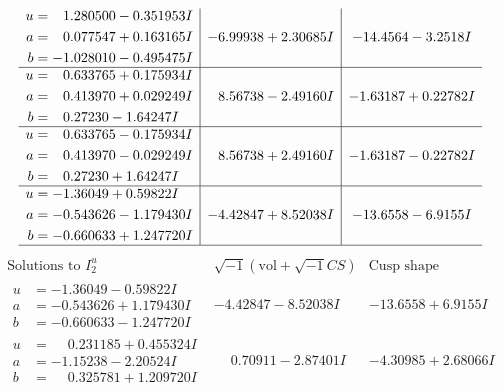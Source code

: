 \documentclass[1p]{elsarticle_modified}
\theoremstyle{definition}
\newcommand{\I}{\sqrt{-1}}
\begin{document}
$$\begin{array}{c|c|c}
\begin{aligned}
u &= \phantom{-}1.280500 - 0.351953 I \\
a &= \phantom{-}0.077547 + 0.163165 I \\
b &= -1.028010 - 0.495475 I\end{aligned}
 & -6.99938 + 2.30685 I & -14.4564 - 3.2518 I \\ \hline\begin{aligned}
u &= \phantom{-}0.633765 + 0.175934 I \\
a &= \phantom{-}0.413970 + 0.029249 I \\
b &= \phantom{-}0.27230 - 1.64247 I\end{aligned}
 & \phantom{-}8.56738 - 2.49160 I & -1.63187 + 0.22782 I \\ \hline\begin{aligned}
u &= \phantom{-}0.633765 - 0.175934 I \\
a &= \phantom{-}0.413970 - 0.029249 I \\
b &= \phantom{-}0.27230 + 1.64247 I\end{aligned}
 & \phantom{-}8.56738 + 2.49160 I & -1.63187 - 0.22782 I \\ \hline\begin{aligned}
u &= -1.36049 + 0.59822 I \\
a &= -0.543626 - 1.179430 I \\
b &= -0.660633 + 1.247720 I\end{aligned}
 & -4.42847 + 8.52038 I & -13.6558 - 6.9155 I\\
 \hline 
 \end{array}$$\newpage$$\begin{array}{c|c|c}  
\text{Solutions to }I^u_{2}& \I (\text{vol} + \sqrt{-1}CS) & \text{Cusp shape}\\
 \hline 
\begin{aligned}
u &= -1.36049 - 0.59822 I \\
a &= -0.543626 + 1.179430 I \\
b &= -0.660633 - 1.247720 I\end{aligned}
 & -4.42847 - 8.52038 I & -13.6558 + 6.9155 I \\ \hline\begin{aligned}
u &= \phantom{-}0.231185 + 0.455324 I \\
a &= -1.15238 - 2.20524 I \\
b &= \phantom{-}0.325781 + 1.209720 I\end{aligned}
 & \phantom{-}0.70911 - 2.87401 I & -4.30985 + 2.68066 I \\ \hline\begin{aligned}

\end{aligned}
\end{array}$$
\end{document}
